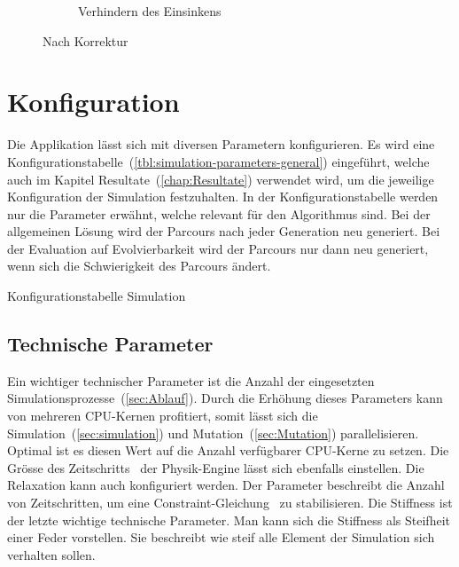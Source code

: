 \begin{figure}[H]
\begin{subfigure}[b]{0.45\textwidth}
            \caption{Verhindern des Einsinkens\label{fig:noNachEinsinken}}
          \end{subfigure}
          \caption{Nach Korrektur}
        \end{figure}

  \section{Konfiguration\label{sec:Konfiguration}}

    Die Applikation lässt sich mit diversen Parametern konfigurieren.
    Es wird eine Konfigurationstabelle~(\vref{tbl:simulation-parameters-general}) eingeführt,
    welche auch im Kapitel Resultate~(\vref{chap:Resultate}) verwendet wird,
    um die jeweilige Konfiguration der Simulation festzuhalten. In der Konfigurationstabelle werden nur die Parameter erwähnt,
    welche relevant für den Algorithmus sind. Bei der allgemeinen Lösung wird der Parcours
    nach jeder Generation neu generiert. Bei der Evaluation auf Evolvierbarkeit
    wird der Parcours nur dann neu generiert, wenn sich die Schwierigkeit des Parcours ändert.

    \begin{table}[H]
      
      \caption{Konfigurationstabelle Simulation\label{tbl:simulation-parameters-general}}
    \end{table}

    \subsection{Technische Parameter\label{sub:techParams}}

      Ein wichtiger technischer Parameter ist die Anzahl der eingesetzten Simulationsprozesse~(\vref{sec:Ablauf}).
      Durch die Erhöhung dieses Parameters kann von mehreren CPU-Kernen profitiert,
      somit lässt sich die Simulation~(\vref{sec:simulation}) und Mutation~(\vref{sec:Mutation}) parallelisieren.
      Optimal ist es diesen Wert auf die Anzahl verfügbarer CPU-Kerne zu setzen.
      Die Grösse des Zeitschritts~\cite{bullet:steppingTheWorld} der Physik-Engine lässt sich ebenfalls einstellen.
      Die Relaxation kann auch konfiguriert werden.
      Der Parameter beschreibt die Anzahl von Zeitschritten,
      um eine Constraint-Gleichung~\cite{gamedev:constraints} zu stabilisieren.
      Die Stiffness ist der letzte wichtige technische Parameter.
      Man kann sich die Stiffness als Steifheit einer Feder vorstellen.
      Sie beschreibt wie steif alle Element der Simulation sich verhalten sollen.

